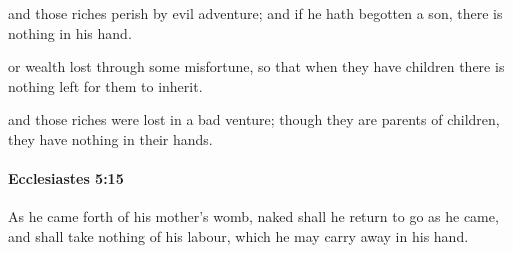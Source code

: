 			\begin{versebox}
					\item[BHS] 
					\item[LXX] 
					\item[ASV] and those riches perish by evil adventure; and if he hath begotten a son, there is nothing in his hand.
					\item[NIV] or wealth lost through some misfortune, so that when they have children there is nothing left for them to inherit.
					\item[NRSV] and those riches were lost in a bad venture; though they are parents of children, they have nothing in their hands.
			\end{versebox}

		\paragraph{Ecclesiastes 5:15} %
			\label{ECCLESIASTES-5-15}

			As he came forth of his mother’s womb, naked shall he return to go as he came, and shall take nothing of his labour, which he may carry away in his hand.

